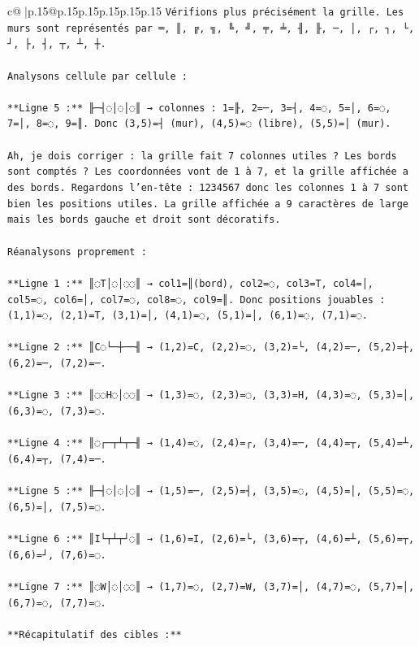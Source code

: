 \documentclass{article}
\begin{document}
{\begin{supertabular}{c@{$\;$}|p{.15\linewidth}@{}p{.15\linewidth}p{.15\linewidth}p{.15\linewidth}p{.15\linewidth}p{.15\linewidth}}
{{{\texttt{Vérifions plus précisément la grille. Les murs sont représentés par ═, ║, ╔, ╗, ╚, ╝, ╤, ╧, ╢, ╟, ─, │, ┌, ┐, └, ┘, ├, ┤, ┬, ┴, ┼.} \\
\\ 
\texttt{Analysons cellule par cellule :} \\
\\ 
\texttt{**Ligne 5 :** ╟─┤◌│◌│◌║ → colonnes : 1=╟, 2=─, 3=┤, 4=◌, 5=│, 6=◌, 7=│, 8=◌, 9=║. Donc (3,5)=┤ (mur), (4,5)=◌ (libre), (5,5)=│ (mur).} \\
\\ 
\texttt{Ah, je dois corriger : la grille fait 7 colonnes utiles ? Les bords sont comptés ? Les coordonnées vont de 1 à 7, et la grille affichée a des bords. Regardons l'en{-}tête :  1234567 donc les colonnes 1 à 7 sont bien les positions utiles. La grille affichée a 9 caractères de large mais les bords gauche et droit sont décoratifs.} \\
\\ 
\texttt{Réanalysons proprement :} \\
\\ 
\texttt{**Ligne 1 :** ║◌T│◌│◌◌║ → col1=║(bord), col2=◌, col3=T, col4=│, col5=◌, col6=│, col7=◌, col8=◌, col9=║. Donc positions jouables : (1,1)=◌, (2,1)=T, (3,1)=│, (4,1)=◌, (5,1)=│, (6,1)=◌, (7,1)=◌.} \\
\\ 
\texttt{**Ligne 2 :** ║C◌└─┼──╢ → (1,2)=C, (2,2)=◌, (3,2)=└, (4,2)=─, (5,2)=┼, (6,2)=─, (7,2)=─.} \\
\\ 
\texttt{**Ligne 3 :** ║◌◌H◌│◌◌║ → (1,3)=◌, (2,3)=◌, (3,3)=H, (4,3)=◌, (5,3)=│, (6,3)=◌, (7,3)=◌.} \\
\\ 
\texttt{**Ligne 4 :** ║◌┌─┬┴┬─╢ → (1,4)=◌, (2,4)=┌, (3,4)=─, (4,4)=┬, (5,4)=┴, (6,4)=┬, (7,4)=─.} \\
\\ 
\texttt{**Ligne 5 :** ╟─┤◌│◌│◌║ → (1,5)=─, (2,5)=┤, (3,5)=◌, (4,5)=│, (5,5)=◌, (6,5)=│, (7,5)=◌.} \\
\\ 
\texttt{**Ligne 6 :** ║I└┬┴┬┘◌║ → (1,6)=I, (2,6)=└, (3,6)=┬, (4,6)=┴, (5,6)=┬, (6,6)=┘, (7,6)=◌.} \\
\\ 
\texttt{**Ligne 7 :** ║◌W│◌│◌◌║ → (1,7)=◌, (2,7)=W, (3,7)=│, (4,7)=◌, (5,7)=│, (6,7)=◌, (7,7)=◌.} \\
\\ 
\texttt{**Récapitulatif des cibles :**} \\
}}}
\end{supertabular}}
\end{document}
